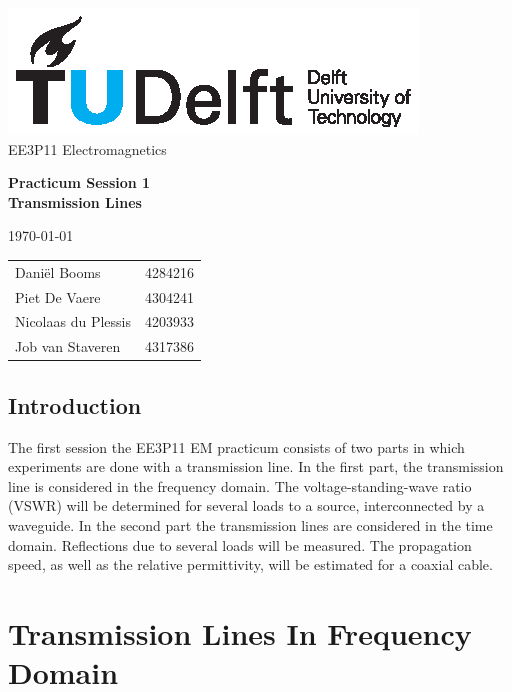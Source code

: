 \documentclass[11pt,a4paper]{article}
\begin{document}
\noindent
\begin{center}
\includegraphics[width=\columnwidth]{tudelftlogo.eps} \\

EE3P11 Electromagnetics\\
\begin{LARGE}
\textbf{Practicum Session 1 \\ Transmission Lines} \\[0.3cm]
\end{LARGE}
\today \\[.2cm]
\begin{tabular}{l l}
Dani\"el Booms & 4284216 \\
Piet De Vaere & 4304241 \\
Nicolaas du Plessis & 4203933 \\
Job van Staveren & 4317386

\end{tabular}
\end{center}






\subsection*{Introduction}
The first session the EE3P11 EM practicum consists of two parts in which experiments are done with a transmission line. In the first part, the transmission line is considered in the frequency domain. The voltage-standing-wave ratio (VSWR) will be determined for several loads to a source, interconnected by a waveguide. In the second part the transmission lines are considered in the time domain. Reflections due to several loads will be measured. The propagation speed, as well as the relative permittivity, will be estimated for a coaxial cable.

\section{Transmission Lines In Frequency Domain}
\end{document}
